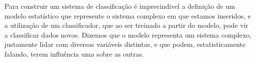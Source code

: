 
Para construir um sistema de classificação é imprecindivel a definição de um modelo estatístico que represente o sistema complexo em que estamos inseridos, e a utilização de um classificador, que ao ser treinado a partir do modelo, pode vir a classificar dados novos. Dizemos que o modelo representa um sistema complexo, justamente lidar com diversas variáveis distintas, e que podem, estatisticamente falando, terem influência uma sobre as outras.


\begin{comment}
 1 - Primeiro podemos começar definindo conceitos básicos como categoria, modelo de dados, e
 quais modelos alternativos ao bayer existem, e porquê utilizamos o bayer.

 Definir como um modelo de dados é construido, isso implica em abordar os conceitos estatísticos visto
 nas vídeo aulas do youtube.

 Definir como algorítmo de bayer utiliza o modelo de dados.
\end{comment}
